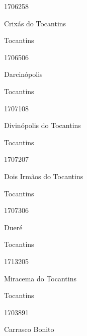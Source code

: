 \documentclass[
  letterpaper,
]{report}
\begin{document}
1706258

\n      

Crixás do Tocantins

\n    

\n    

\n      

Tocantins

\n      

1706506

\n      

Darcinópolis

\n    

\n    

\n      

Tocantins

\n      

1707108

\n      

Divinópolis do Tocantins

\n    

\n    

\n      

Tocantins

\n      

1707207

\n      

Dois Irmãos do Tocantins

\n    

\n    

\n      

Tocantins

\n      

1707306

\n      

Dueré

\n    

\n    

\n      

Tocantins

\n      

1713205

\n      

Miracema do Tocantins

\n    

\n    

\n      

Tocantins

\n      

1703891

\n      

Carrasco Bonito

\n    
\end{document}
